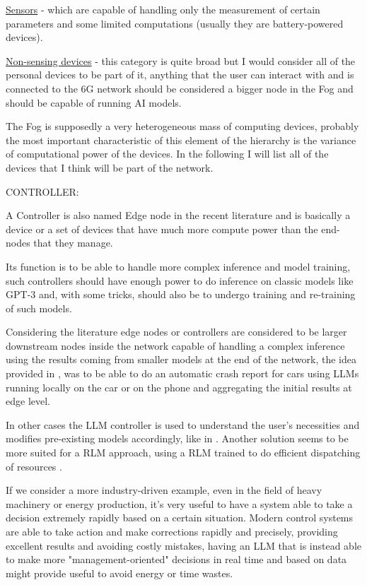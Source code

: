 \underline{Sensors} - which are capable of handling only the measurement of certain parameters and some limited computations (usually they are battery-powered devices).

\underline{Non-sensing devices} - this category is quite broad but I would consider all of the personal
devices to be part of it, anything that the user can interact with and is connected to the 6G network should be considered a bigger node in the Fog and should be capable of running AI models.

The Fog is supposedly a very heterogeneous mass of computing devices, probably the most important
characteristic of this element of the hierarchy is the variance of computational power of the
devices. In the following I will list all of the devices that I think will be part of the network.

\bigskip
\noindent
CONTROLLER:
\label{ssec:controller}

A Controller is also named Edge node in the recent literature and is basically a device or a set of
devices that have much more compute power than the end-nodes that they manage.

Its function is to be able to handle more complex inference and model training, such controllers
should have enough power to do inference on classic models like GPT-3 and, with some tricks, should
also be to undergo training and re-training of such models.

Considering the literature edge nodes or controllers are considered to be larger downstream nodes inside the
network capable of handling a complex inference using the results coming from smaller models at the
end of the network, the idea provided in \cite{pga}, was to be able to do an automatic crash report
for cars using LLMs running locally on the car or on the phone and aggregating the initial results
at edge level.

In other cases the LLM controller is used to understand the user's necessities and modifies
pre-existing models accordingly, like in \cite{ai4ci}. Another solution seems to be more suited for a RLM
approach, using a RLM trained to do efficient dispatching of resources \cite{llm6G}.

If we consider a more industry-driven example, even in the field of heavy machinery or energy
production, it's very useful to have a system able to take a decision extremely rapidly based on a
certain situation. Modern control systems are able to take action and make corrections rapidly and
precisely, providing excellent results and avoiding costly mistakes, having an LLM that is instead able
to make more "management-oriented" decisions in real time and based on data might provide useful to avoid
energy or time wastes.

